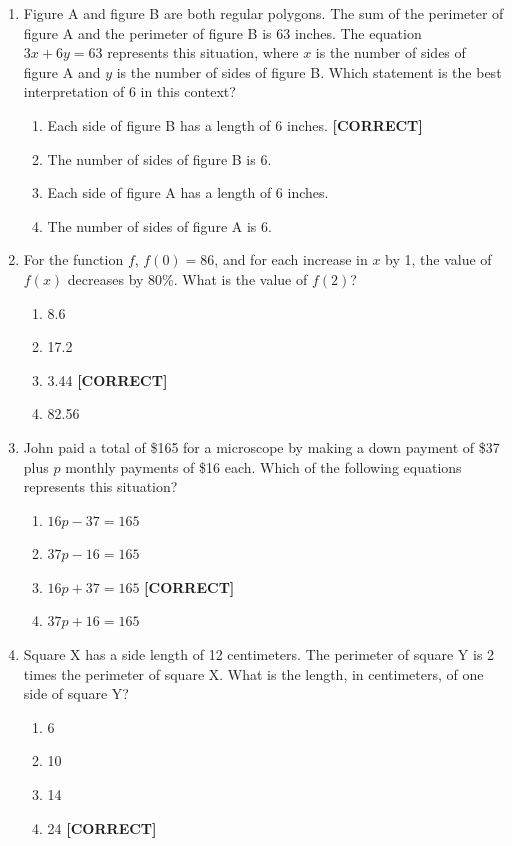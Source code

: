 \documentclass[12pt]{article}
\begin{document}
\begin{enumerate}
\item Figure A and figure B are both regular polygons. The sum of the perimeter of figure A and the perimeter of figure B is 63 inches. The equation $3x + 6y = 63$ represents this situation, where $x$ is the number of sides of figure A and $y$ is the number of sides of figure B. Which statement is the best interpretation of 6 in this context?
\begin{enumerate}
    \item[(a)] Each side of figure B has a length of 6 inches. \quad \textbf{[CORRECT]}
    \item[(b)] The number of sides of figure B is 6.
    \item[(c)] Each side of figure A has a length of 6 inches.
    \item[(d)] The number of sides of figure A is 6.
\end{enumerate}

\item For the function $f$, $f(0) = 86$, and for each increase in $x$ by 1, the value of $f(x)$ decreases by 80\%. What is the value of $f(2)$?
\begin{enumerate}
    \item[(a)] 8.6
    \item[(b)] 17.2
    \item[(c)] 3.44 \quad \textbf{[CORRECT]}
    \item[(d)] 82.56
\end{enumerate}

\item John paid a total of \$165 for a microscope by making a down payment of \$37 plus $p$ monthly payments of \$16 each. Which of the following equations represents this situation?
\begin{enumerate}
    \item[(a)] $16p - 37 = 165$
    \item[(b)] $37p - 16 = 165$
    \item[(c)] $16p + 37 = 165$ \quad \textbf{[CORRECT]}
    \item[(d)] $37p + 16 = 165$
\end{enumerate}

\item Square X has a side length of 12 centimeters. The perimeter of square Y is 2 times the perimeter of square X. What is the length, in centimeters, of one side of square Y?
\begin{enumerate}
    \item[(a)] 6
    \item[(b)] 10
    \item[(c)] 14
    \item[(d)] 24 \quad \textbf{[CORRECT]}
\end{enumerate}


\end{enumerate}
\end{document}
